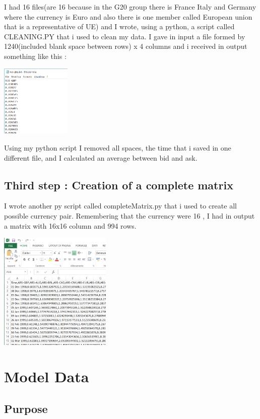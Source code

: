 \documentclass[sigconf]{acmart}
\begin{document}
I had 16 files(are 16 because in the G20 group there is France Italy and Germany where the currency is Euro and also there is one member called European union that is a representative of UE) and I wrote, using a python, a script called CLEANING.PY that i used to clean my data. I gave in input a file formed by 1240(included blank space between rows) x 4 columns and i received in output something like this : 

\includegraphics[width=0.25\textwidth]{aaa1.png}

Using my python script I removed all spaces, the time that i saved in one different file, and I calculated an average between bid and ask.

\subsection{Third step : Creation of a complete matrix } 
I wrote another py script called completeMatrix.py that i used to create all possible currency pair. Remembering that the currency were 16 , I had in output a matrix with 16x16 column and 994 rows.
 

\includegraphics[width=0.4\textwidth]{bbb.png}


\section{Model Data}

\subsection{Purpose}
\end{document}
